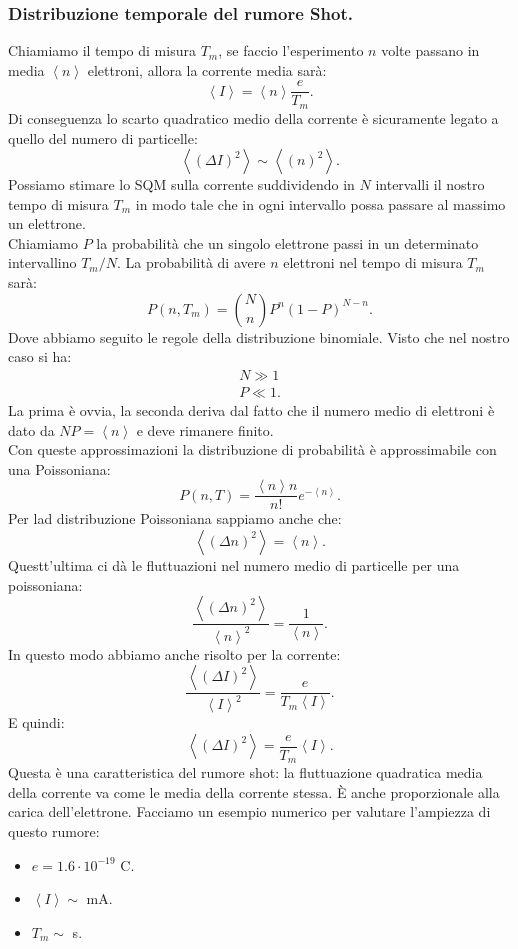 \subsubsection{Distribuzione temporale del rumore Shot.}
\label{subsubsec:Distribuzione temporale del rumore Shot.}
Chiamiamo il tempo di misura $T_m$, se faccio l'esperimento $n$ volte passano in media $\left<n \right>$ elettroni, allora la corrente media sarà:
\[
	\left<I\right>
	=
	\left<n\right>\frac{e}{T_m}
.\] 
Di conseguenza lo scarto quadratico medio della corrente è sicuramente legato a quello del numero di particelle:
\[
	\left< \left( \Delta I \right)^2  \right>  \sim \left<\left(n\right)^2\right>
.\] 
Possiamo stimare lo SQM sulla corrente suddividendo in $N$ intervalli il nostro tempo di misura $T_m$ in modo tale che in ogni intervallo possa passare al massimo un elettrone. \\
Chiamiamo $P$ la probabilità che un singolo elettrone passi in un determinato intervallino $T_m/N$. 
La probabilità di avere $n$ elettroni nel tempo di misura $T_m$ sarà:
\[
	P( n, T_m) = \binom{N}{n} P^n \left( 1- P \right)^{N-n}
.\] 
Dove abbiamo seguito le regole della distribuzione binomiale. Visto che nel nostro caso si ha:
\[\begin{aligned}
	N\gg 1\\
	P\ll 1
.\end{aligned}\]
La prima è ovvia, la seconda deriva dal fatto che il numero medio di elettroni è dato da $NP = \left<n \right>$ e deve rimanere finito. \\
Con queste approssimazioni la distribuzione di probabilità è approssimabile con una Poissoniana:
\[
	P( n,T) 
	=
	\frac{\left<n \right>n}{n!}e^{-\left<n \right>}
.\] 
Per lad distribuzione Poissoniana sappiamo anche che:
\[
	\left<\left( \Delta n\right) ^2 \right> = \left<n \right>
.\] 
Questt'ultima ci dà le fluttuazioni nel numero medio di particelle per una poissoniana:
\[
	\frac{\left<\left( \Delta n \right)^2 \right>}{\left<n \right>^2}
	=
	\frac{1}{\left<n \right>}
.\] 
In questo modo abbiamo anche risolto per la corrente:
\[
	\frac{\left<\left(\Delta I\right)^2\right>}{\left<I\right>^2}
	=
	\frac{e}{T_m \left< I \right>}
.\] 
E quindi:
\[
	\left<\left( \Delta I \right) ^2 \right> 
	= 
	\frac{e}{T_m}\left<I \right>
.\] 
Questa è una caratteristica del rumore shot: la fluttuazione quadratica media della corrente va come le media della corrente stessa. È anche proporzionale alla carica dell'elettrone. Facciamo un esempio numerico per valutare l'ampiezza di questo rumore:
\begin{itemize}
	\item $e=1.6 \cdot 10^{-19}$ C.
	\item $\left<I \right>\sim$ mA.
	\item $T_m\sim$ s.
\end{itemize}
